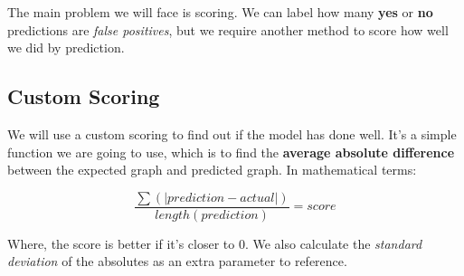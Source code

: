 The main problem we will face is scoring. We can label how many \textbf{yes} or \textbf{no} predictions are \textit{false positives}, but we require another method to score how well we did by prediction.

\subsection{Custom Scoring}

We will use a custom scoring to find out if the model has done well. It's a simple function we are going to use, which is to find the \textbf{average absolute difference} between the expected graph and predicted graph. In mathematical terms:

$$\frac{\sum \left(|prediction - actual|\right)}{length(prediction)} = score$$

Where, the score is better if it's closer to 0. We also calculate the \textit{standard deviation} of the absolutes as an extra parameter to reference.


